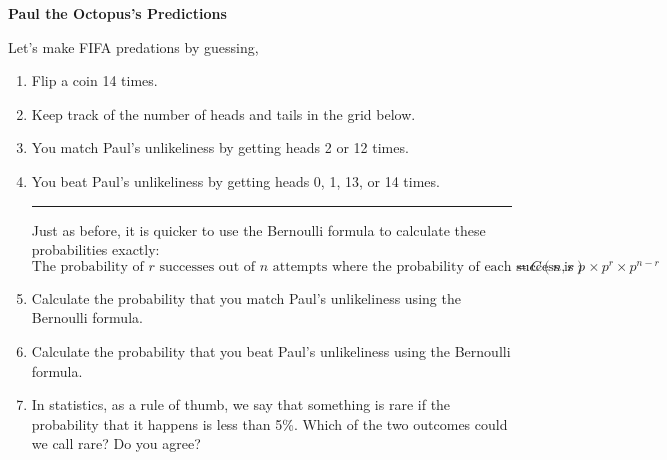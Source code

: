 
\textbf{Paul the Octopus's Predictions}

Let's make FIFA predations by guessing,

\begin{enumerate}
	\item Flip a coin 14 times.
	\item Keep track of the number of heads and tails in the grid below.
	\item You match Paul's unlikeliness by getting heads 2 or 12 times.
	\item You beat Paul's unlikeliness by getting heads 0, 1, 13, or 14 times.
	
	
\noindent\rule[0.5ex]{\linewidth}{1pt}
	
	
	Just as before, it is quicker to use the Bernoulli formula to calculate these probabilities exactly:
	\[ \text{The probability of \(r\) successes out of \(n\) attempts where the probability of each success is \(p\) } = C(n,r)\times p^r \times p^{n-r}\] 
	\item Calculate the probability that you match Paul's unlikeliness using the Bernoulli formula.
	\vfill
		\item Calculate the probability that you beat Paul's unlikeliness using the Bernoulli formula.
	\vfill
	
	\item In statistics, as a rule of thumb, we say that something is rare if the probability that it happens is less than 5\%. Which of the two outcomes could we call rare? Do you agree? \vfill
\end{enumerate}